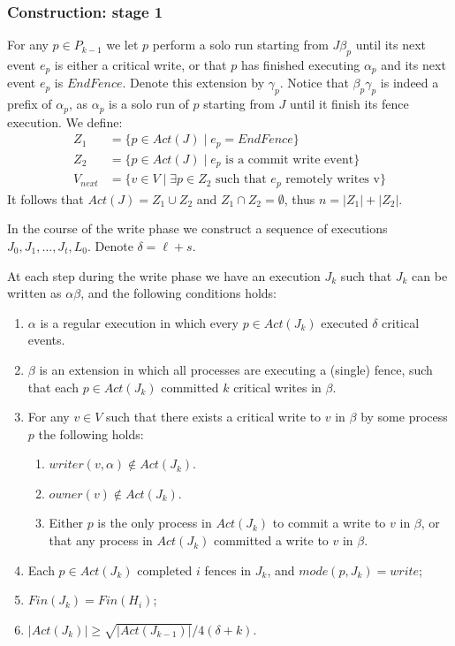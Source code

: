 \subsubsection{Construction: stage 1}
For any $p \in P_{k-1}$ we let $p$ perform a solo run starting from $J \beta_p$ until its next event $e_p$ is either a critical write, or that $p$ has finished executing $\alpha_p$ and its next event $e_p$ is $EndFence$. Denote this extension by $\gamma_p$. Notice that $\beta_p \gamma_p$ is indeed a prefix of $\alpha_p$, as $\alpha_p$ is a solo run of $p$ starting from $J$ until it finish its fence execution. We define:
\begin{align*}
Z_1 &= \{p \in Act(J) \mid e_p = EndFence\} \\
Z_2 &= \{p \in Act(J) \mid e_p \text{ is a commit write event}\} \\
V_{next} &= \{v \in V \mid \exists p \in Z_2 \text{ such that } e_p \text{ remotely writes v}\}
\end{align*}
It follows that $Act(J) = Z_1 \cup Z_2$ and $Z_1 \cap Z_2 = \emptyset$, thus $n = |Z_1|+|Z_2|$.
















In the course of the write phase we construct a sequence of executions $J_0,J_1,\ldots,J_t, L_0$. Denote $\delta = \ell+s$.

\begin{lemma} \label{write-phase-lemma}
	At each step during the write phase we have an execution $J_k$ such that $J_k$ can be written as $\alpha \beta$, and the following conditions holds:
	\begin{enumerate}[(1)]
		\item $\alpha$ is a regular execution in which every $p \in Act(J_k)$ executed $\delta$ critical events.
		\item $\beta$ is an extension in which all processes are executing a (single) fence, such that each $p \in Act(J_k)$ committed $k$ critical writes in $\beta$.
		\item For any $v \in V$ such that there exists a critical write to $v$ in $\beta$ by some process $p$ the following holds:
		\begin{enumerate}
			\item $writer(v,\alpha) \notin Act(J_k)$.
			\item $owner(v) \notin Act(J_k)$.
			\item Either $p$ is the only process in $Act(J_k)$ to commit a write to $v$ in $\beta$, or that any process in $Act(J_k)$ committed a write to $v$ in $\beta$.
		\end{enumerate}
		\item Each $p\in Act(J_k)$ completed $i$ fences in $J_k$, and $mode(p, J_k) = write$;
		\item $Fin(J_k) = Fin(H_i)$;
		\item $|Act(J_k)| \geq \sqrt{|Act(J_{k-1})|}/4(\delta+k)$.
	\end{enumerate}
\end{lemma}

